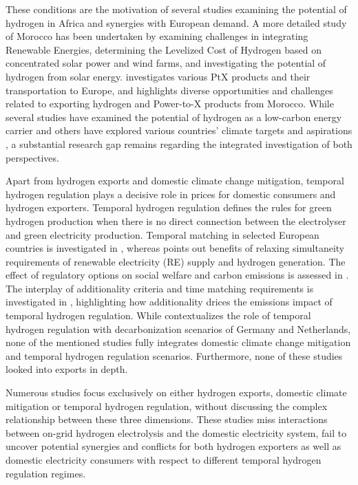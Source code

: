 These conditions are the motivation of several studies \cite{vanWijk2021, AbouSeada2022, vanderZwaan2021, Schellekens2010, Cavana2021, Touili2022, Timmerberg2019a, Sens2022} examining the potential of hydrogen in Africa and synergies with European demand. A more detailed study of Morocco has been undertaken by \cite{Boulakhbar2020} examining challenges in integrating Renewable Energies, \cite{Khouya2020} determining the Levelized Cost of Hydrogen based on concentrated solar power and wind farms, and \cite{Touili2018} investigating the potential of hydrogen from solar energy. \cite{Hampp2023} investigates various PtX products and their transportation to Europe, and \cite{Eichhammer2019} highlights diverse opportunities and challenges related to exporting hydrogen and Power-to-X products from Morocco. While several studies \cite{Hampp2023, AbouSeada2022, vanWijk2021} have examined the potential of hydrogen as a low-carbon energy carrier and others have explored various countries' climate targets and aspirations \cite{Boulakhbar2020}, a substantial research gap remains regarding the integrated investigation of both perspectives. 


Apart from hydrogen exports and domestic climate change mitigation, temporal hydrogen regulation plays a decisive role in prices for domestic consumers and hydrogen exporters. 
Temporal hydrogen regulation defines the rules for green hydrogen production when there is no direct connection between the electrolyser and green electricity production.
Temporal matching in selected European countries is investigated in \cite{Zeyen2024}, whereas \cite{Ruhnau2023a} points out benefits of relaxing simultaneity requirements of renewable electricity (RE) supply and hydrogen generation. 
The effect of regulatory options on social welfare and carbon emissions is assessed in \cite{Brauer2022}. The interplay of additionality criteria and time matching requirements is investigated in \cite{Giovanniello2024}, highlighting how additionality drices the emissions impact of temporal hydrogen regulation.
While \cite{Zeyen2024} contextualizes the role of temporal hydrogen regulation with decarbonization scenarios of Germany and Netherlands, none of the mentioned studies fully integrates domestic climate change mitigation and temporal hydrogen regulation scenarios. Furthermore, none of these studies looked into exports in depth.

Numerous studies focus exclusively on either hydrogen exports, domestic climate mitigation or temporal hydrogen regulation, without discussing the complex relationship between these three dimensions. These studies miss interactions between on-grid hydrogen electrolysis and the domestic electricity system, fail to uncover potential synergies and conflicts for both hydrogen exporters as well as domestic electricity consumers with respect to different temporal hydrogen regulation regimes.



